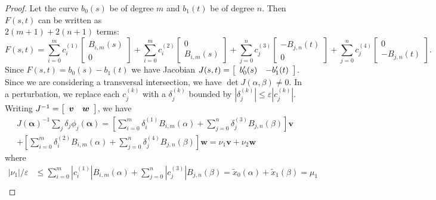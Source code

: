 \documentclass[3p, authoryear, square]{elsarticle}
\theoremstyle{definition}
\newcommand{\eps}{\varepsilon}
\begin{document}
\begin{proof}
Let the curve \(b_0(s)\) be of degree \(m\) and \(b_1(t)\) be of degree \(n\).
Then \(F(s, t)\) can be written as \\ \(2(m + 1) + 2(n + 1)\) terms:
\begin{equation}
F(s, t) =
  \sum_{i = 0}^m c_i^{(1)} \left[ \begin{array}{c}
  B_{i, m}(s) \\ 0 \end{array}\right] +
  \sum_{i = 0}^m c_i^{(2)} \left[ \begin{array}{c}
  0 \\ B_{i, m}(s) \end{array}\right] +
  \sum_{j = 0}^n c_j^{(3)} \left[ \begin{array}{c}
  -B_{j, n}(t) \\ 0 \end{array}\right] +
  \sum_{j = 0}^n c_j^{(4)} \left[ \begin{array}{c}
  0 \\ -B_{j, n}(t) \end{array}\right].
\end{equation}
Since \(F(s, t) = b_0(s) - b_1(t)\) we have Jacobian \(J(s, t) =
\left[ \begin{array}{c c} b_0'(s) & -b_1'(t) \end{array}\right]\). Since we
are considering a transversal intersection, we have
\(\det J(\alpha, \beta) \neq 0\). In a perturbation, we replace each
\(c_j^{(k)}\) with a \(\delta_j^{(k)}\) bounded by
\(\left|\delta_j^{(k)}\right| \leq \eps \left|c_j^{(k)}\right|\).
Writing \(J^{-1} = \left[ \begin{array}{c c}
\bm{v} & \bm{w} \end{array}\right]\), we have
\begin{multline}
J\left(\bm{\alpha}\right)^{-1} \sum_j \delta_j
  \phi_j\left(\bm{\alpha}\right) =
  \left[\sum_{i = 0}^m \delta_i^{(1)} B_{i, m}(\alpha) +
  \sum_{j = 0}^n \delta_j^{(3)} B_{j, n}(\beta)\right] \bm{v} \\
  + \left[\sum_{i = 0}^m \delta_i^{(2)} B_{i, m}(\alpha) +
  \sum_{j = 0}^n \delta_j^{(4)} B_{j, n}(\beta)\right] \bm{w} =
  \nu_1 \bm{v} + \nu_2 \bm{w}
\end{multline}
where
\begin{align}
\left|\nu_1\right| / \eps &\leq \sum_{i = 0}^m
  \left|c_{i}^{(1)}\right| B_{i, m}\left(\alpha\right) + \sum_{j = 0}^n
  \left|c_{j}^{(3)}\right| B_{j, n}\left(\beta\right) =
  \widetilde{x}_0(\alpha) + \widetilde{x}_1(\beta) = \mu_1 \\

\end{align}
\end{proof}
\end{document}
